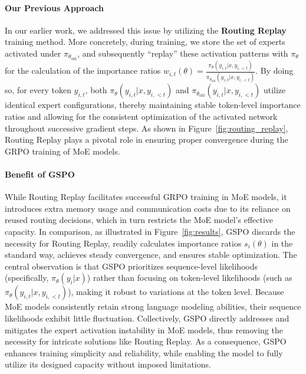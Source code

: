 \paragraph{Our Previous Approach} In our earlier work, we addressed this issue by utilizing the \textbf{Routing Replay} training method. More concretely, during training, we store the set of experts activated under $\pi_{\theta_\text{old}}$, and subsequently ``replay'' these activation patterns with $\pi_{\theta}$ for the calculation of the importance ratios $w_{i,t}(\theta) = \frac{ \pi_{\theta} (y_{i,t} | x, y_{i,<t}) }{ \pi_{\theta_\text{old}} (y_{i,t} | x,y_{i,<t})}$. By doing so, for every token $y_{i,t}$, both $\pi_{\theta} (y_{i,t} | x, y_{i,<t})$ and $\pi_{\theta_\text{old}} (y_{i,t} | x,y_{i,<t})$ utilize identical expert configurations, thereby maintaining stable token-level importance ratios and allowing for the consistent optimization of the activated network throughout successive gradient steps. As shown in Figure~\ref{fig:routing_replay}, Routing Replay plays a pivotal role in ensuring proper convergence during the GRPO training of MoE models.

\paragraph{Benefit of GSPO} While Routing Replay facilitates successful GRPO training in MoE models, it introduces extra memory usage and communication costs due to its reliance on reused routing decisions, which in turn restricts the MoE model's effective capacity. In comparison, as illustrated in Figure~\ref{fig:results}, GSPO discards the necessity for Routing Replay, readily calculates importance ratios $s_i(\theta)$ in the standard way, achieves steady convergence, and ensures stable optimization. The central observation is that GSPO prioritizes sequence-level likelihoods (specifically, $\pi_{\theta} (y_i | x)$) rather than focusing on token-level likelihoods (such as $\pi_{\theta} (y_{i,t} | x, y_{i,<t})$), making it robust to variations at the token level. Because MoE models consistently retain strong language modeling abilities, their sequence likelihoods exhibit little fluctuation. Collectively, GSPO directly addresses and mitigates the expert activation instability in MoE models, thus removing the necessity for intricate solutions like Routing Replay. As a consequence, GSPO enhances training simplicity and reliability, while enabling the model to fully utilize its designed capacity without imposed limitations.

